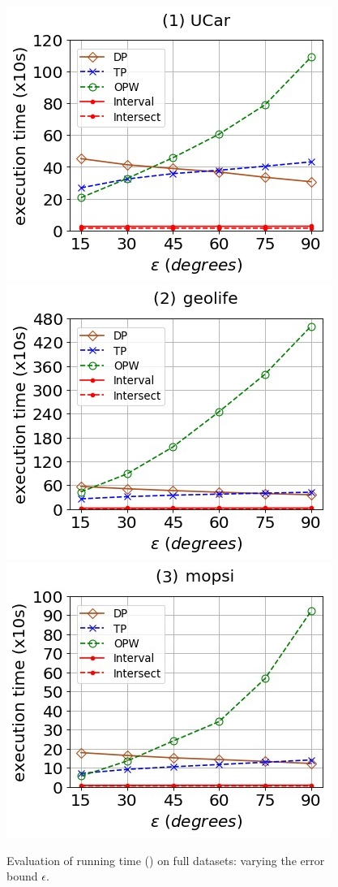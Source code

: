 \begin{figure}[tb!]
	\centering
	\includegraphics[scale=0.500]{Figures/Exp-DAD-time-epsilon-service.jpg} 	\hspace{2ex}
	\includegraphics[scale=0.500]{Figures/Exp-DAD-time-epsilon-geolife.jpg}	\hspace{2ex}
	\includegraphics[scale=0.500]{Figures/Exp-DAD-time-epsilon-mopsi.jpg}		
	\vspace{-2ex}
	\caption{\small Evaluation of running time (\dad) on full datasets: varying the error bound $\epsilon$.}\label{fig:time-epsilon-dad}
	\vspace{-2ex}
\end{figure}


